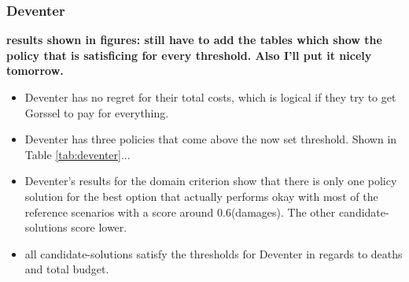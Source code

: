 \subsubsection{Deventer}
\textbf{results shown in figures: still have to add the tables which show the policy that is satisficing for every threshold. Also I'll put it nicely tomorrow. }
\begin{itemize}
    \item Deventer has no regret for their total costs, which is logical if they try to get Gorssel to pay for everything.
    \item Deventer has three policies that come above the now set threshold. Shown in Table \ref{tab:deventer}...
    \item Deventer's results for the domain criterion show that there is only one policy solution for the best option that actually performs okay with most of the reference scenarios with a score around 0.6(damages). The other candidate-solutions score lower. 
    \item all candidate-solutions satisfy the thresholds for Deventer in regards to deaths and total budget.
\end{itemize}

